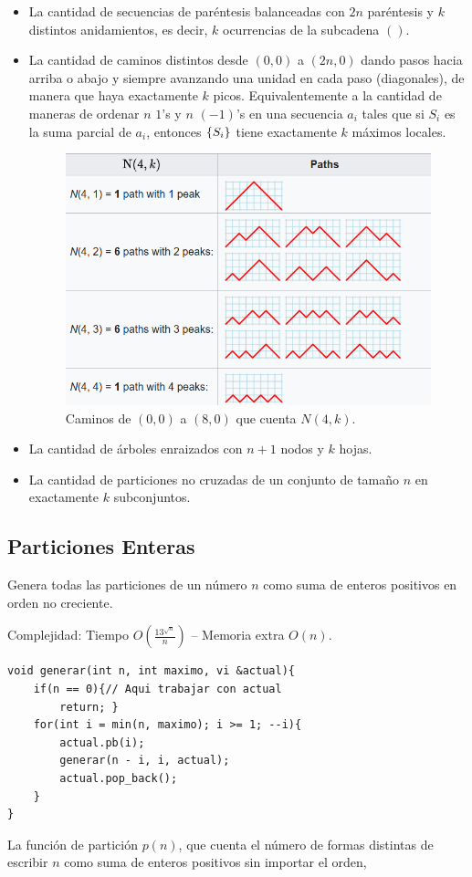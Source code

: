 \documentclass[12 pts,spanish,mexico]{article}
\newcommand{\Pa}[1]{\left( #1 \right)}
\numberwithin{equation}{section}
\DeclarePairedDelimiter{\set}{\{}{\}}
\begin{document}
\begin{multicols}{2}
\begin{itemize}
    \item La cantidad de secuencias de paréntesis balanceadas con $2n$ paréntesis y $k$ distintos anidamientos, es decir, $k$ ocurrencias de la subcadena $()$.
    \item La cantidad de caminos distintos desde $(0, 0)$ a $(2n, 0)$ dando pasos hacia arriba o abajo y siempre avanzando una unidad en cada paso (diagonales), de manera que haya exactamente $k$ picos. Equivalentemente a la cantidad de maneras de ordenar $n$ $1$'s y $n$ $(-1)$'s en una secuencia $a_i$ tales que si $S_i$ es la suma parcial de $a_i$, entonces $\set{S_i}$ tiene exactamente $k$ máximos locales.
    \begin{figure}[H]
        \centering
        \includegraphics[width=0.5\linewidth]{img/caminos_picos_narayana.png}
        \caption{Caminos de $(0,0)$ a $(8, 0)$ que cuenta $N(4, k)$.}
    \end{figure}
    \item La cantidad de árboles enraizados con $n + 1$ nodos y $k$ hojas.
    \item La cantidad de particiones no cruzadas de un conjunto de tamaño $n$ en exactamente $k$ subconjuntos.
\end{itemize}


\subsection{Particiones Enteras}

Genera todas las particiones de un número \(n\) como suma de enteros positivos en orden no creciente.

Complejidad: Tiempo \(O\Pa{ \frac{13^{\sqrt{n}}}{n} }\) – Memoria extra \(O(n)\).

\begin{verbatim}
void generar(int n, int maximo, vi &actual){
    if(n == 0){// Aqui trabajar con actual
        return; }
    for(int i = min(n, maximo); i >= 1; --i){
        actual.pb(i);
        generar(n - i, i, actual);
        actual.pop_back();
    }
}
\end{verbatim}
La función de partición \( p(n) \), que cuenta el número de formas distintas de escribir \( n \) como suma de enteros positivos sin importar el orden,


\end{multicols}
\end{document}
